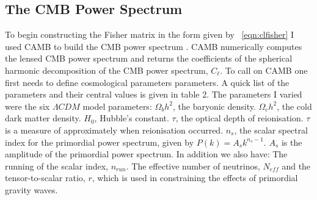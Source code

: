 \subsection{The CMB Power Spectrum}

To begin constructing the Fisher matrix in the form given by ~\ref{eqn:clfisher} I used CAMB to build the CMB power spectrum \cite{Challinor:2005jy}. CAMB numerically computes the lensed CMB power spectrum and returns the coefficients of the spherical harmonic decomposition of the CMB power spectrum, $C_{\ell}$. To call on CAMB one first needs to define cosmological parameters parameters. A quick list of the parameters and their central values is given in table 2. The parameters I varied were the six $\Lambda CDM$ model parameters: $\Omega_{b}h^{2}$, the baryonic density. $\Omega_{c}h^{2}$, the cold dark matter density. $H_0$, Hubble's constant. $\tau$, the optical depth of reionisation. $\tau$ is a measure of approximately when reionisation occurred. $n_s$, the scalar spectral index for the primordial power spectrum, given by $P(k) = A_s k^{n_s - 1}$. $A_s$ is the amplitude of the primordial power spectrum. In addition we also have: The running of the scalar index, $n_{run}$. The effective number of neutrinos, $N_{eff}$ and the tensor-to-scalar ratio, $r$, which is used in constraining the effects of primordial gravity waves.

